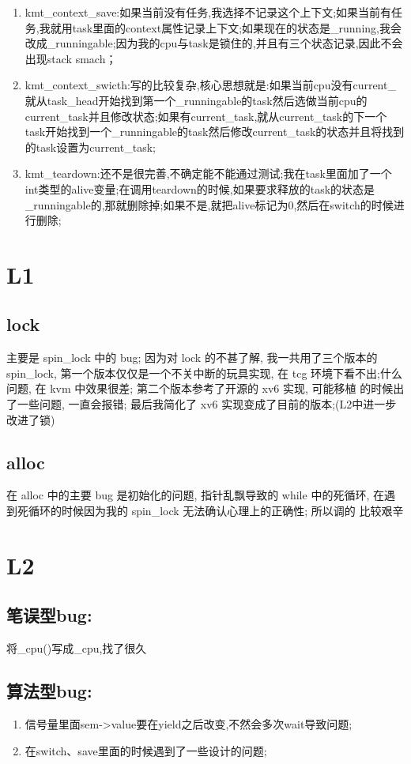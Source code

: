 \documentclass[11pt, a4paper, UTF8]{ctexart}
\begin{document}
\begin{enumerate}
\begin{itemize}
\end{itemize}
\item kmt\_context\_save:如果当前没有任务,我选择不记录这个上下文;如果当前有任务,我就用task里面的context属性记录上下文;如果现在的状态是\_running,我会改成\_runningable;因为我的cpu与task是锁住的,并且有三个状态记录,因此不会出现stack smach；
\item kmt\_context\_swicth:写的比较复杂,核心思想就是:如果当前cpu没有current\_就从task\_head开始找到第一个\_runningable的task然后选做当前cpu的current\_task并且修改状态;如果有current\_task,就从current\_task的下一个task开始找到一个\_runningable的task然后修改current\_task的状态并且将找到的task设置为current\_task;
\item kmt\_teardown:还不是很完善,不确定能不能通过测试;我在task里面加了一个int类型的alive变量;在调用teardown的时候,如果要求释放的task的状态是\_runningable的,那就删除掉;如果不是,就把alive标记为0,然后在switch的时候进行删除;
\end{enumerate}

\begincorrection
\section{L1}
\subsection{lock}主要是 spin\_lock 中的 bug; 因为对 lock 的不甚了解, 我一共用了三个版本的
spin\_lock, 第一个版本仅仅是一个不关中断的玩具实现, 在 tcg 环境下看不出;什么问题, 在 kvm 中效果很差; 第二个版本参考了开源的 xv6 实现, 可能移植
的时候出了一些问题, 一直会报错; 最后我简化了 xv6 实现变成了目前的版本;(L2中进一步改进了锁)
\subsection{alloc}在 alloc 中的主要 bug 是初始化的问题, 指针乱飘导致的 while 中的死循环,
在遇到死循环的时候因为我的 spin\_lock 无法确认心理上的正确性; 所以调的
比较艰辛
\section{L2}
\subsection{笔误型bug:}将\_cpu()写成\_cpu,找了很久
\subsection{算法型bug:}
\begin{enumerate}
\item 信号量里面sem->value要在yield之后改变,不然会多次wait导致问题;
\item 在switch、save里面的时候遇到了一些设计的问题;
\end{enumerate}
\end{document}
